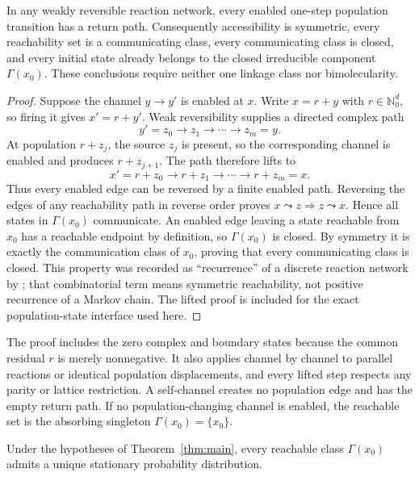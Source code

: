 \begin{lemma}\label{lem:state-cycle}
In any weakly reversible reaction network, every enabled one-step population
transition has a return path.  Consequently accessibility is symmetric,
every reachability set is a communicating class, every communicating class is
closed, and every initial state already belongs to the closed irreducible
component \(\Gamma(x_0)\).
These conclusions require neither one linkage class nor bimolecularity.
\end{lemma}

\begin{proof}
Suppose the channel \(y\to y'\) is enabled at \(x\).  Write \(x=r+y\) with
\(r\in\mathbb N_0^d\), so firing it gives \(x'=r+y'\).  Weak reversibility
supplies a directed complex path
\[
  y'=z_0\longrightarrow z_1\longrightarrow\cdots
      \longrightarrow z_m=y.
\]
At population \(r+z_j\), the source \(z_j\) is present, so the corresponding
channel is enabled and produces \(r+z_{j+1}\).  The path therefore lifts to
\[
  x'=r+z_0\longrightarrow r+z_1\longrightarrow\cdots
      \longrightarrow r+z_m=x.
\]
Thus every enabled edge can be reversed by a finite enabled path.  Reversing
the edges of any reachability path in reverse order proves
\(x\leadsto z\Rightarrow z\leadsto x\).  Hence all states in
\(\Gamma(x_0)\) communicate.  An enabled edge leaving a state reachable from
\(x_0\) has a reachable endpoint by definition, so \(\Gamma(x_0)\) is closed.
By symmetry it is exactly the communication class of \(x_0\), proving that
every communicating class is closed.
This property was recorded as ``recurrence'' of a discrete reaction network by
\citet[Lemmas~4.5--4.6]{PauleveCraciunKoeppl2014}; that combinatorial term
means symmetric reachability, not positive recurrence of a Markov chain.  The
lifted proof is included for the exact population-state interface used here.
\end{proof}

The proof includes the zero complex and boundary states because the common
residual \(r\) is merely nonnegative.  It also applies channel by channel to
parallel reactions or identical population displacements, and every lifted
step respects any parity or lattice restriction.  A self-channel creates no
population edge and has the empty return path.  If no population-changing
channel is enabled, the reachable set is the absorbing singleton
\(\Gamma(x_0)=\{x_0\}\).

\begin{corollary}\label{cor:stationary}
Under the hypotheses of Theorem~\ref{thm:main}, every reachable class
\(\Gamma(x_0)\) admits a unique stationary probability distribution.
\end{corollary}

